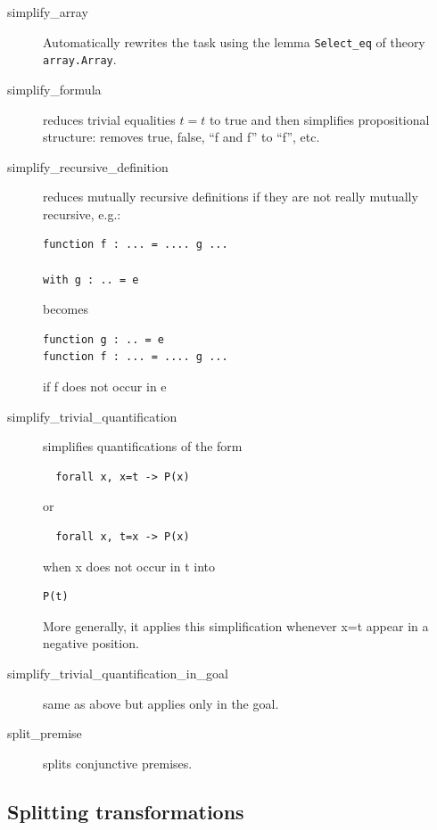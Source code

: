 \begin{description}

\item[simplify\_array] Automatically rewrites the task using the lemma
  \verb|Select_eq| of theory \verb|array.Array|.

\item[simplify\_formula] reduces trivial equalities $t=t$ to true and
  then simplifies propositional structure: removes true, false, ``f
  and f'' to ``f'', etc.

\item[simplify\_recursive\_definition] reduces mutually recursive
  definitions if they are not really mutually recursive, e.g.:
\begin{verbatim}
function f : ... = .... g ...

with g : .. = e
\end{verbatim}
becomes
\begin{verbatim}
function g : .. = e
function f : ... = .... g ...
\end{verbatim}
if f does not occur in e

\item[simplify\_trivial\_quantification]
  simplifies quantifications of the form
\begin{verbatim}
  forall x, x=t -> P(x)
\end{verbatim}
or
\begin{verbatim}
  forall x, t=x -> P(x)
\end{verbatim}
  when x does not occur in t
  into
\begin{verbatim}
P(t)
\end{verbatim}
  More generally, it applies this simplification whenever x=t appear
  in a negative position.

\item[simplify\_trivial\_quantification\_in\_goal]
  same as above but applies only in the goal.

\item[split\_premise]
  splits conjunctive premises.

\end{description}

\subsection{Splitting transformations}

